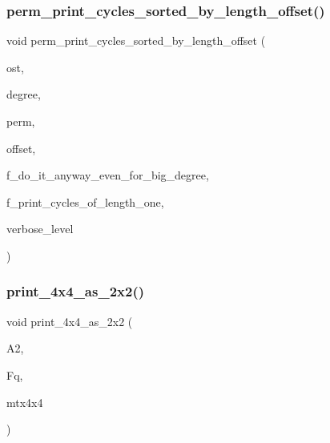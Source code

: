 \mbox{\label{action__global_8_c_a9d1f2e34879c04dbc45d08984a8066e3}} 
\subsubsection{\texorpdfstring{perm\+\_\+print\+\_\+cycles\+\_\+sorted\+\_\+by\+\_\+length\+\_\+offset()}{perm\_print\_cycles\_sorted\_by\_length\_offset()}}
{\footnotesize\ttfamily void perm\+\_\+print\+\_\+cycles\+\_\+sorted\+\_\+by\+\_\+length\+\_\+offset (\begin{DoxyParamCaption}\item[{ostream \&}]{ost,  }\item[{\mbox{\hyperlink{galois_8h_a09fddde158a3a20bd2dcadb609de11dc}{I\+NT}}}]{degree,  }\item[{\mbox{\hyperlink{galois_8h_a09fddde158a3a20bd2dcadb609de11dc}{I\+NT}} $\ast$}]{perm,  }\item[{\mbox{\hyperlink{galois_8h_a09fddde158a3a20bd2dcadb609de11dc}{I\+NT}}}]{offset,  }\item[{\mbox{\hyperlink{galois_8h_a09fddde158a3a20bd2dcadb609de11dc}{I\+NT}}}]{f\+\_\+do\+\_\+it\+\_\+anyway\+\_\+even\+\_\+for\+\_\+big\+\_\+degree,  }\item[{\mbox{\hyperlink{galois_8h_a09fddde158a3a20bd2dcadb609de11dc}{I\+NT}}}]{f\+\_\+print\+\_\+cycles\+\_\+of\+\_\+length\+\_\+one,  }\item[{\mbox{\hyperlink{galois_8h_a09fddde158a3a20bd2dcadb609de11dc}{I\+NT}}}]{verbose\+\_\+level }\end{DoxyParamCaption})}

\mbox{\label{action__global_8_c_a7efef3bbdb9093d54f1909f234469632}} 
\subsubsection{\texorpdfstring{print\+\_\+4x4\+\_\+as\+\_\+2x2()}{print\_4x4\_as\_2x2()}}
{\footnotesize\ttfamily void print\+\_\+4x4\+\_\+as\+\_\+2x2 (\begin{DoxyParamCaption}\item[{\mbox{\hyperlink{classaction}{action}} $\ast$}]{A2,  }\item[{\mbox{\hyperlink{classfinite__field}{finite\+\_\+field}} $\ast$}]{Fq,  }\item[{\mbox{\hyperlink{galois_8h_a09fddde158a3a20bd2dcadb609de11dc}{I\+NT}} $\ast$}]{mtx4x4 }\end{DoxyParamCaption})}

